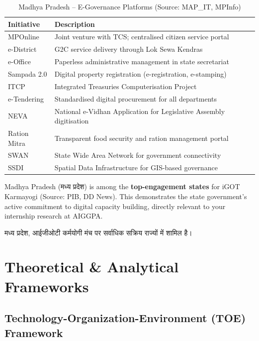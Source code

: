 \documentclass[12pt,a4paper]{article}
\newcommand{\hindi}[1]{{\hindifont #1}}
\begin{document}
\begin{table}[H]
\centering
\caption{Madhya Pradesh  --  E-Governance Platforms (Source: MAP\_IT, MPInfo)}
\label{tab:mp_egov}
\begin{tabularx}{\textwidth}{@{}lX@{}}
\toprule
\textbf{Initiative} & \textbf{Description} \\
\midrule
MPOnline & Joint venture with TCS; centralised citizen service portal \\
e-District & G2C service delivery through Lok Sewa Kendras \\
e-Office & Paperless administrative management in state secretariat \\
Sampada 2.0 & Digital property registration (e-registration, e-stamping) \\
ITCP & Integrated Treasuries Computerisation Project \\
e-Tendering & Standardised digital procurement for all departments \\
NEVA & National e-Vidhan Application for Legislative Assembly digitisation \\
Ration Mitra & Transparent food security and ration management portal \\
SWAN & State Wide Area Network for government connectivity \\
SSDI & Spatial Data Infrastructure for GIS-based governance \\
\bottomrule
\end{tabularx}
\end{table}

\begin{notebox}
Madhya Pradesh (\hindi{मध्य प्रदेश}) is among the \textbf{top-engagement states} for iGOT Karmayogi (Source: PIB, DD News). This demonstrates the state government's active commitment to digital capacity building, directly relevant to your internship research at AIGGPA.

\hindi{मध्य प्रदेश, आईजीओटी कर्मयोगी मंच पर सर्वाधिक सक्रिय राज्यों में शामिल है।}
\end{notebox}

\section{Theoretical \& Analytical Frameworks}

\subsection{Technology-Organization-Environment (TOE) Framework}
\end{document}
